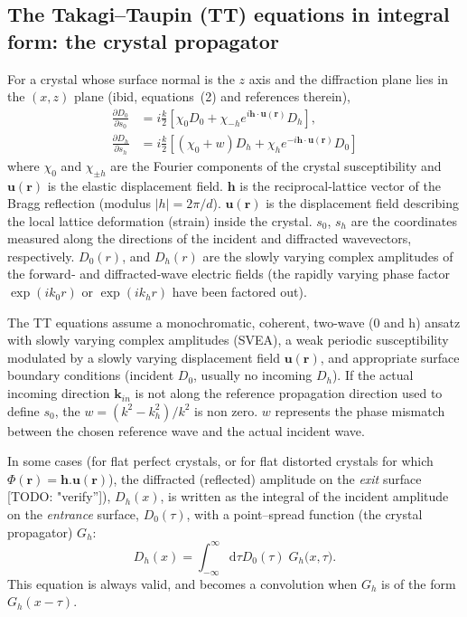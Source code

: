 \documentclass[preprint]{iucr}              %
\newcommand{\todo}[1]{{\color{red}[TODO: "#1'']}}
\begin{document}
%
\subsection{The Takagi--Taupin (TT) equations in integral form: the crystal propagator}
\label{sec:TT}

For a crystal whose surface normal is the \(z\) axis and the diffraction plane lies in the \((x,z)\) plane (ibid, equations~(2) and references therein),
\begin{subequations}
\begin{align}
\frac{\partial D_{0}}{\partial s_{0}} &= 
i \frac{k}{2} [
\chi_{0} D_{0} + \chi_{-h} e^{i\mathbf{h} \cdot \mathbf{u}(\mathbf r)} D_{h}],
\\
\frac{\partial D_{h}}{\partial s_{h}}
&=
i\frac{k}{2} [(\chi_{0}+w) D_{h}
   + \chi_{h} e^{-i\mathbf{h} \cdot \mathbf{u}(\mathbf r)}D_{0}]
\end{align}
\end{subequations}
where \(\chi_{0}\) and \(\chi_{\pm h}\) are the Fourier components of the crystal susceptibility and
\(\mathbf u(\mathbf r)\) is the elastic displacement field.
$\textbf{h}$ is the reciprocal‑lattice vector of the Bragg reflection (modulus 
$ |h| = 2 \pi / d$).
$\textbf{u}(\textbf{r})$ is the displacement field describing the local lattice deformation (strain) inside the crystal.
$s_0$, $s_h$ are the coordinates measured along the directions of the incident and diffracted wavevectors, respectively.
$D_0(r)$, and $D_h(r)$ are the slowly varying complex amplitudes of the forward‑ and diffracted‑wave electric fields (the rapidly varying phase factor $\exp(i k_0 r)$ or $\exp(i k_h r)$ have been factored out).


The TT equations assume a monochromatic, coherent, two-wave (0 and h) ansatz with slowly varying complex amplitudes (SVEA), a weak periodic susceptibility modulated by a slowly varying displacement field $\textbf{u}(\textbf{r})$, and appropriate surface boundary conditions (incident $D_0$, usually no incoming $D_h$).
If the actual incoming direction $\textbf{k}_{in}$ is not along the reference propagation direction used to define $s_0$, the $w=(k^2-k_h^2)/k^2$ is non zero. $w$ represents the phase mismatch between the chosen reference wave and the actual incident wave. 

In some cases (for flat perfect crystals, or for flat distorted crystals for which $\Phi(\textbf{r})=\textbf{h} . \textbf{u}(\textbf{r})$), the diffracted (reflected) amplitude on the \emph{exit} surface \todo{verify}), $D_{h}(x)$, is written as the integral of the incident amplitude on the \emph{entrance} surface, $D_{0}(\tau)$, with a point–spread function (the crystal propagator) $G_{h}$:
\begin{equation}
D_{h}(x)=
\int_{-\infty}^{\infty}\! \mathrm{d}\tau 
D_{0}(\tau)\;
G_{h}\!\bigl(x,\tau\bigr).
\label{eq:conv}
\end{equation}
This equation is always valid, and becomes a convolution when $G_h$ is of the form $G_h(x-\tau)$.
\end{document}
